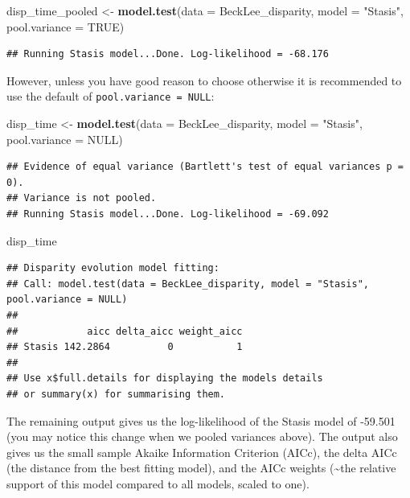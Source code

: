 \documentclass[]{book}
\newenvironment{Shaded}{\begin{snugshade}}{\end{snugshade}}
\newcommand{\DataTypeTok}[1]{\textcolor[rgb]{0.13,0.29,0.53}{#1}}
\newcommand{\KeywordTok}[1]{\textcolor[rgb]{0.13,0.29,0.53}{\textbf{#1}}}
\newcommand{\NormalTok}[1]{#1}
\newcommand{\OtherTok}[1]{\textcolor[rgb]{0.56,0.35,0.01}{#1}}
\newcommand{\StringTok}[1]{\textcolor[rgb]{0.31,0.60,0.02}{#1}}
\begin{document}
\begin{Shaded}
\begin{Highlighting}[]
\NormalTok{disp_time_pooled <-}\StringTok{ }\KeywordTok{model.test}\NormalTok{(}\DataTypeTok{data =}\NormalTok{ BeckLee_disparity,}
                               \DataTypeTok{model =} \StringTok{"Stasis"}\NormalTok{,}
                               \DataTypeTok{pool.variance =} \OtherTok{TRUE}\NormalTok{)}
\end{Highlighting}
\end{Shaded}

\begin{verbatim}
## Running Stasis model...Done. Log-likelihood = -68.176
\end{verbatim}

However, unless you have good reason to choose otherwise it is recommended to use the default of \texttt{pool.variance\ =\ NULL}:

\begin{Shaded}
\begin{Highlighting}[]
\NormalTok{disp_time <-}\StringTok{ }\KeywordTok{model.test}\NormalTok{(}\DataTypeTok{data =}\NormalTok{ BeckLee_disparity,}
                        \DataTypeTok{model =} \StringTok{"Stasis"}\NormalTok{,}
                        \DataTypeTok{pool.variance =} \OtherTok{NULL}\NormalTok{)}
\end{Highlighting}
\end{Shaded}

\begin{verbatim}
## Evidence of equal variance (Bartlett's test of equal variances p = 0).
## Variance is not pooled.
## Running Stasis model...Done. Log-likelihood = -69.092
\end{verbatim}

\begin{Shaded}
\begin{Highlighting}[]
\NormalTok{disp_time}
\end{Highlighting}
\end{Shaded}

\begin{verbatim}
## Disparity evolution model fitting:
## Call: model.test(data = BeckLee_disparity, model = "Stasis", pool.variance = NULL) 
## 
##            aicc delta_aicc weight_aicc
## Stasis 142.2864          0           1
## 
## Use x$full.details for displaying the models details
## or summary(x) for summarising them.
\end{verbatim}

The remaining output gives us the log-likelihood of the Stasis model of -59.501 (you may notice this change when we pooled variances above).
The output also gives us the small sample Akaike Information Criterion (AICc), the delta AICc (the distance from the best fitting model), and the AICc weights (\textasciitilde{}the relative support of this model compared to all models, scaled to one).
\end{document}
